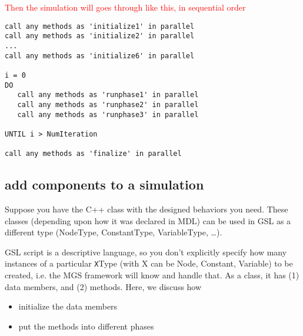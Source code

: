 \textcolor{red}{Then the simulation will goes through like this, in sequential
order}
\begin{verbatim}
call any methods as 'initialize1' in parallel
call any methods as 'initialize2' in parallel
...
call any methods as 'initialize6' in parallel

i = 0
DO
   call any methods as 'runphase1' in parallel
   call any methods as 'runphase2' in parallel
   call any methods as 'runphase3' in parallel
   
UNTIL i > NumIteration

call any methods as 'finalize' in parallel

\end{verbatim}

\subsection{add components to a simulation}

Suppose you have the C++ class with the designed behaviors you need. 
These classes (depending upon how it was declared in MDL) can be used in
GSL as a different type (NodeType, ConstantType, VariableType, \ldots).

GSL script is a descriptive language, so you don't explicitly specify how many
instances of a particular \verb!X!Type (with X can be Node, Constant, Variable)
to be created, i.e. the MGS framework will know and handle that.
As a class, it has (1) data members, and (2) methods.
Here, we discuss how
\begin{itemize}
  \item initialize the data members
  
  \item put the methods into different phases
\end{itemize}

